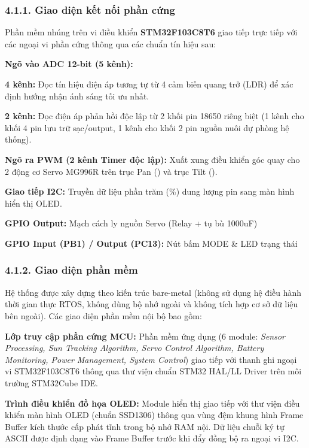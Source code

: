 \documentclass[12pt,a4paper]{report}
\begin{document}
\subsubsection*{4.1.1. Giao diện kết nối phần cứng }

Phần mềm nhúng trên vi điều khiển \textbf{STM32F103C8T6} giao tiếp trực tiếp với các ngoại vi phần cứng thông qua các chuẩn tín hiệu sau:

\textbf{Ngõ vào ADC 12-bit (5 kênh):}

\textbf{4 kênh:} Đọc tín hiệu điện áp tương tự từ 4 cảm biến quang trở (LDR) để xác định hướng nhận ánh sáng tối ưu nhất.

\textbf{2 kênh:} Đọc điện áp phản hồi độc lập từ 2 khối pin 18650 riêng biệt (1 kênh cho khối 4 pin lưu trữ sạc/output, 1 kênh cho khối 2 pin nguồn nuôi dự phòng hệ thống). 

\textbf{Ngõ ra PWM (2 kênh Timer độc lập):} Xuất xung điều khiển góc quay cho 2 động cơ Servo MG996R trên trục Pan () và trục Tilt ().

\textbf{Giao tiếp I2C:} Truyền dữ liệu phần trăm (\%) dung lượng pin sang màn hình hiển thị OLED.

\textbf{GPIO Output: }Mạch cách ly nguồn Servo (Relay  + tụ bù 1000uF) 

\textbf{GPIO Input (PB1) / Output (PC13): }Nút bấm MODE \& LED trạng thái 

\subsubsection*{4.1.2. Giao diện phần mềm}

Hệ thống được xây dựng theo kiến trúc bare-metal (không sử dụng hệ điều hành thời gian thực RTOS, không dùng bộ nhớ ngoài và không tích hợp cơ sở dữ liệu bên ngoài). Các giao diện phần mềm nội bộ bao gồm:

\textbf{Lớp truy cập phần cứng MCU:} Phần mềm ứng dụng (6 module: \textit{Sensor Processing, Sun Tracking Algorithm, Servo Control Algorithm, Battery Monitoring, Power Management, System Control}) giao tiếp với thanh ghi ngoại vi STM32F103C8T6 thông qua thư viện chuẩn STM32 HAL/LL Driver trên môi trường STM32Cube IDE. 

\textbf{Trình điều khiển đồ họa OLED:} Module hiển thị giao tiếp với thư viện điều khiển màn hình OLED (chuẩn SSD1306) thông qua vùng đệm khung hình Frame Buffer kích thước\textbf{ } cấp phát tĩnh trong bộ nhớ RAM nội. Dữ liệu chuỗi ký tự ASCII được định dạng vào Frame Buffer trước khi đẩy đồng bộ ra ngoại vi I2C. 
\end{document}
